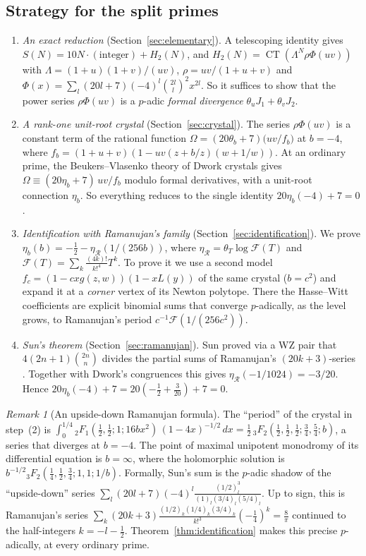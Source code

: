 \documentclass[11pt]{amsart}
\theoremstyle{definition}
\theoremstyle{remark}
\newtheorem{remark}[theorem]{Remark}
\newcommand{\CT}{\operatorname{CT}}
\newcommand{\cF}{\mathcal{F}}
\begin{document}
\subsection{Strategy for the split primes}
\begin{enumerate}[leftmargin=*]
\item \emph{An exact reduction} (Section~\ref{sec:elementary}). A telescoping identity gives
$S(N)=10N\cdot(\text{integer})+H_2(N)$, and $H_2(N)=\CT(\Lambda^N\rho\Phi(uv))$ with
$\Lambda=(1+u)(1+v)/(uv)$, $\rho=uv/(1+u+v)$ and
$\Phi(x)=\sum_l(20l+7)(-4)^l\binom{2l}l^2x^{2l}$. So it suffices to show that the power series
$\rho\Phi(uv)$ is a $p$-adic \emph{formal divergence} $\theta_uJ_1+\theta_vJ_2$.
\item \emph{A rank-one unit-root crystal} (Section~\ref{sec:crystal}). The series
$\rho\Phi(uv)$ is a constant term of the rational function
$\Omega=(20\theta_b+7)\bigl(uv/f_b\bigr)$ at $b=-4$, where
$f_b=(1+u+v)(1-uv(z+b/z)(w+1/w))$. At an ordinary prime, the Beukers--Vlasenko theory of Dwork
crystals \cite{BV1} gives $\Omega\equiv(20\eta_b+7)\,uv/f_b$ modulo formal derivatives,
with a unit-root connection $\eta_b$. So everything reduces to the single identity
$20\eta_b(-4)+7=0$.
\item \emph{Identification with Ramanujan's family} (Section~\ref{sec:identification}). We prove
$\eta_b(b)=-\frac12-\eta_{\mathcal R}(1/(256b))$, where $\eta_{\mathcal R}=\theta_T\log
\cF(T)$ and $\cF(T)=\sum_k\frac{(4k)!}{k!^4}T^k$. To prove it we use a second model
$f_c=(1-cxg(z,w))(1-xL(y))$ of the same crystal ($b=c^2$) and expand it at a
\emph{corner} vertex of its Newton polytope. There the Hasse--Witt coefficients are explicit
binomial sums that converge $p$-adically, as the level grows, to Ramanujan's period
$c^{-1}\cF(1/(256c^2))$.
\item \emph{Sun's theorem} (Section~\ref{sec:ramanujan}). Sun proved via a WZ pair that
$4(2n+1)\binom{2n}n$ divides the partial sums of Ramanujan's $(20k+3)$-series
\cite[Theorem~1.2]{SunEJC}. Together with Dwork's congruences \cite{MV,BV2} this gives
$\eta_{\mathcal R}(-1/1024)=-3/20$. Hence $20\eta_b(-4)+7=20(-\frac12+\frac3{20})+7=0$.
\end{enumerate}

\begin{remark}[An upside-down Ramanujan formula]\label{rem:upside}
The ``period'' of the crystal in step~(2) is
$\int_0^{1/4}{}_2F_1(\frac12,\frac12;1;16bx^2)\,(1-4x)^{-1/2}\,dx=\frac12\,{}_3F_2(\frac12,\frac12,\frac12;\frac34,\frac54;b)$,
a series that diverges at $b=-4$. The point of maximal unipotent monodromy of its differential
equation is $b=\infty$, where the holomorphic solution is
$b^{-1/2}{}_3F_2(\frac14,\frac12,\frac34;1,1;1/b)$. Formally, Sun's sum is the $p$-adic shadow of
the ``upside-down'' series $\sum_l(20l+7)(-4)^l\frac{(1/2)_l^3}{(1)_l(3/4)_l(5/4)_l}$. Up to sign,
this is Ramanujan's series $\sum_k(20k+3)\frac{(1/2)_k(1/4)_k(3/4)_k}{k!^3}(-\frac14)^k=\frac8\pi$
continued to the half-integers $k=-l-\frac12$. Theorem~\ref{thm:identification} makes this precise
$p$-adically, at every ordinary prime.
\end{remark}
\end{document}
